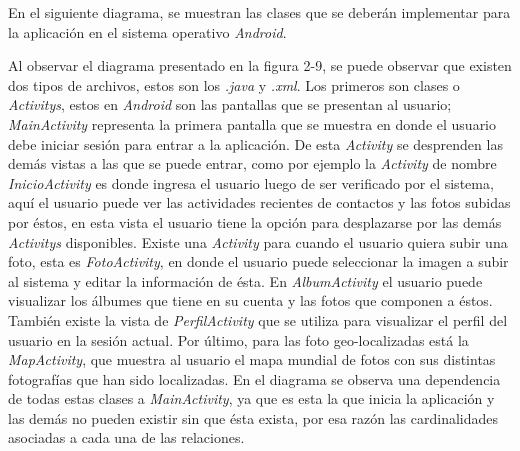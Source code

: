 \documentclass{memoria}
\begin{document}
\newpage
{}

En el siguiente diagrama, se muestran las clases que se deberán implementar para la aplicación en el sistema operativo \textsl{Android}.


Al observar el diagrama presentado en la figura 2-9, se puede observar que existen dos tipos de archivos, estos son los \textsl{.java} y \textsl{.xml}. Los primeros son clases o \textsl{Activitys}, estos en \textsl{Android} son las pantallas que se presentan al usuario; \textsl{MainActivity} representa la primera pantalla que se muestra en donde el usuario debe iniciar sesión para entrar  a la aplicación. De esta \textsl{Activity} se desprenden las demás vistas a las que se puede entrar, como por ejemplo la \textsl{Activity} de nombre \textsl{InicioActivity} es donde ingresa el usuario luego de ser verificado por el sistema, aquí el usuario puede ver las actividades recientes de contactos y las fotos subidas por éstos, en esta vista el usuario tiene la opción para desplazarse por las demás \textsl{Activitys} disponibles. Existe una \textsl{Activity} para cuando el usuario quiera subir una foto, esta es \textsl{FotoActivity}, en donde el usuario puede seleccionar la imagen a subir al sistema y editar la información de ésta. En \textsl{AlbumActivity} el usuario puede visualizar los álbumes que tiene en su cuenta y las fotos que componen a éstos. También existe la vista de \textsl{PerfilActivity} que se utiliza para visualizar el perfil del usuario en la sesión actual. Por último, para las foto geo-localizadas está la \textsl{MapActivity}, que muestra al usuario el mapa mundial de fotos con sus distintas fotografías que han sido localizadas. En el diagrama se observa una dependencia de todas estas clases a \textsl{MainActivity}, ya que es esta la que inicia la aplicación y las demás no pueden existir sin que ésta exista, por esa razón las cardinalidades asociadas a cada una de las relaciones. 
\end{document}
